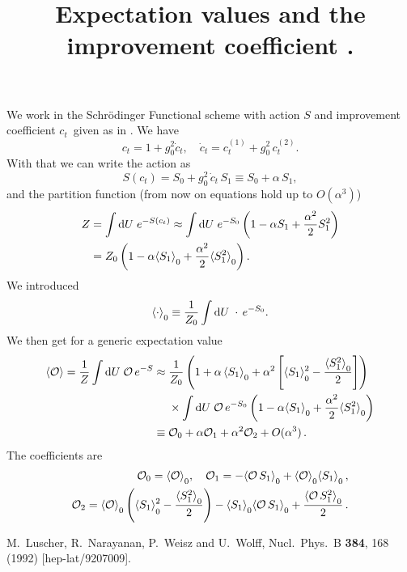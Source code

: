 \documentclass[a4paper]{article}
\title{Expectation values and the improvement coefficient \ct.}
\newcommand{\ct}{\ensuremath{c_t}}
\newcommand{\expv}[1]{\ensuremath{\langle{#1}\rangle}}
\newcommand{\expvz}[1]{\ensuremath{\langle{#1}\rangle_{\raisebox{-.25em}{\scriptsize 0}}}}
\begin{document}
\maketitle

We work in the Schrödinger Functional scheme with action $S$ and
improvement coefficient \ct\ given as in \cite{Luscher:1992an}. We
have
%
\begin{equation}
  c_t = 1 + g_0^2 \dot c_t,\quad \dot c_t = c_t^{(1)} + g_0^2\,c_t^{(2)}.
\end{equation}
%
With that we can write the action as
%
\begin{equation}
  S(c_t) = S_0 + g_0^2 \,\dot c_t \,S_1 \equiv S_0 + \alpha\, S_1,
\end{equation}
%
and the partition function (from now on equations hold up to $O(\alpha^3)$)
%
\begin{align}
  Z &= \int \mathrm{d}U\; e^{-S(c_t)} \approx \int \mathrm{d}U\; e^{-S_0}
  \left( 1 - \alpha S_1 + \frac{\alpha^2}2 S_1^2 \right) \\
  &= Z_0 \left( 1 - \alpha
  \expvz{S_1} + \frac{\alpha^2}2 \expvz{S_1^2} \right).
\end{align}
% 
We introduced
%
\begin{equation}
  \expvz \cdot  \equiv \frac 1 {Z_0} \int \mathrm{d}U\; \cdot \,e^{-S_0}.
\end{equation}
%
We then get for a generic expectation value
%
\begin{align}
  \nonumber
  \expv{\cal O} = \frac 1 Z \int \mathrm{d}U\; {\cal O} \,e^{-S} \approx\;& \frac 1 {Z_0} \left( 1 + \alpha \, \expvz{S_1} +
    \alpha^2\left[\expvz{S_1}^2 - \frac {\expvz{S_1^2}} 2 \right]\right) \\
  \nonumber
  &\times \int \mathrm{d}U\; {\cal O} \,e^{-S_0} \left( 1  - \alpha
  \expvz{S_1} + \frac {\alpha^2}2 \expvz{S_1^2} \right)\\
\equiv \;&{\cal O}_0 + \alpha {\cal O}_1 + \alpha^2 {\cal
    O}_2 + O(\alpha^3)\,.
\end{align}
%
The coefficients are
%
\begin{align}
  {\cal O}_0 = \expvz{\cal O},\quad {\cal O}_1 = -\expvz{{\cal O} \,S_1}
  + \expvz{\cal O}\expvz{S_1}\,,\\
  {\cal O}_2 = \expvz{\cal O} \left( \expvz{S_1}^2 - \frac
    {\expvz{S_1^2}} 2
  \right)
  - \expvz{S_1} \expvz{{\cal O}\,S_1} + \frac{\expvz{{\cal
        O}\,S_1^2}} 2\,.
\end{align}
\begin{thebibliography}{99}
  M.~Luscher, R.~Narayanan, P.~Weisz and U.~Wolff,
  Nucl.\ Phys.\ B {\bf 384}, 168 (1992)
  [hep-lat/9207009].
\end{thebibliography}
\end{document}
